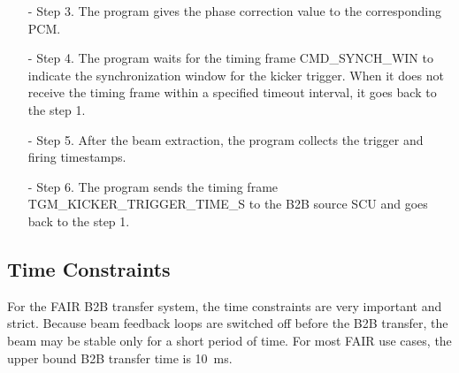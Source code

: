 \begin{itemize}
\begin{itemize}
		\item[-]Step 3. The program gives the phase correction value to the corresponding PCM.
 		\item[-]Step 4. The program waits for the timing frame CMD\_SYNCH\_WIN to indicate the synchronization window for the kicker trigger. When it does not receive the timing frame within a specified timeout interval, it goes back to the step 1.
		\item[-]Step 5. After the beam extraction, the program collects the trigger and firing timestamps. 
		\item[-]Step 6. The program sends the timing frame TGM\_KICKER\_TRIGGER\_TIME\_S to the B2B source SCU and goes back to the step 1.
	\end{itemize}

\end{itemize}
\subsection{Time Constraints}
\label{sec:time_constraint}
For the FAIR B2B transfer system, the time constraints are very important and strict. Because beam feedback loops are switched off before the B2B transfer, the beam may be stable only for a short period of time. For most FAIR use cases, the upper bound B2B transfer time is \SI{10}{\ms}. 

